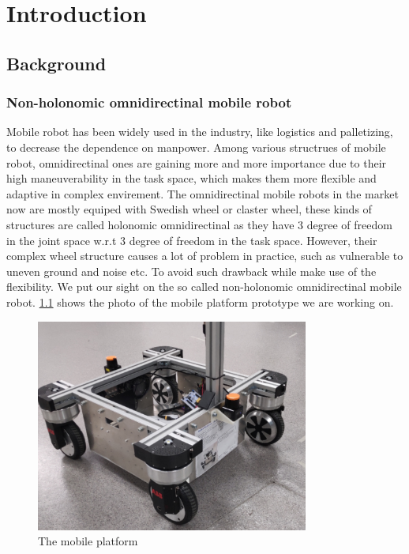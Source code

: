 \chapter{Introduction}
\label{cha:introduction}

\section{Background}
\label{sec:background}
\subsection{Non-holonomic omnidirectinal mobile robot}
Mobile robot has been widely used in the industry, like logistics and palletizing, to decrease the dependence on manpower. Among various structrues of mobile robot, omnidirectinal ones are gaining more and more 
importance due to their high maneuverability in the task space, which makes them more flexible and adaptive in complex envirement. The omnidirectinal mobile robots in the market now are mostly equiped with 
Swedish wheel or claster wheel, these kinds of structures are called holonomic omnidirectinal as they have 3 degree of freedom in the joint space w.r.t 3 degree of freedom in the task space. However, their complex 
wheel structure causes a lot of problem in practice, such as vulnerable to uneven ground and noise etc. To avoid such drawback while make use of the flexibility. We put our sight on the so called non-holonomic 
omnidirectinal mobile robot. \cref{fig:mobilePlatform} shows the photo of the mobile platform prototype we are working on.
\begin{figure}[H]\label{fig:mobilePlatform}
    \centering
    \includegraphics[width=0.8\textwidth]{Figures/mobilePlatform.jpg}
    \caption{The mobile platform}
    \label{fig:mobilePlatform}
\end{figure}

